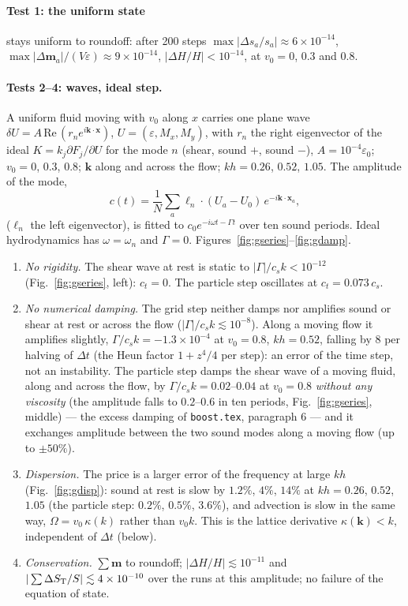 \documentclass[11pt,aps,preprint,nofootinbib,superscriptaddress,tightenlines]{revtex4-2}
\def\st{\begin{equation}}
\def\stp{\end{equation}}
\def\Fig#1{Fig.~\ref{#1}}
\let\oldparagraph\paragraph
\renewcommand{\paragraph}{\par\bigskip\oldparagraph}
\begin{document}
\paragraph{Test 1: the uniform state} stays uniform to roundoff: after 200 steps
$\max|\Delta s_a/s_a|\approx6\times10^{-14}$, $\max|\Delta\bm m_a|/(V\varepsilon)\approx9\times10^{-14}$,
$|\Delta H/H|<10^{-14}$, at $v_0=0$, $0.3$ and $0.8$.

\paragraph{Tests 2--4: waves, ideal step.}  A uniform fluid moving with $v_0$ along $x$ carries one
plane wave $\delta U=A\,\mathrm{Re}\,(r_n e^{i\bm k\cdot\bm x})$, $U=(\varepsilon,M_x,M_y)$, with $r_n$ the right
eigenvector of the ideal $K=k_j\partial F_j/\partial U$ for the mode $n$ (shear, sound $+$, sound $-$),
$A=10^{-4}\varepsilon_0$; $v_0=0$, $0.3$, $0.8$; $\bm k$ along and across the flow; $kh=0.26$, $0.52$, $1.05$.
The amplitude of the mode,
\st
c(t)=\frac1N\sum_a\ell_n\cdot(U_a-U_0)\,e^{-i\bm k\cdot\bm x_a},
\stp
($\ell_n$ the left eigenvector), is fitted to $c_0e^{-i\omega t-\Gamma t}$ over ten sound periods.  Ideal
hydrodynamics has $\omega=\omega_n$ and $\Gamma=0$.  Figures~\ref{fig:gseries}--\ref{fig:gdamp}.
\begin{enumerate}
\item \emph{No rigidity.}  The shear wave at rest is static to $|\Gamma|/c_sk<10^{-12}$
  (\Fig{fig:gseries}, left): $c_t=0$.  The particle step oscillates at $c_t=0.073\,c_s$.
\item \emph{No numerical damping.}  The grid step neither damps nor amplifies sound or shear at rest
  or across the flow ($|\Gamma|/c_sk\lesssim10^{-8}$).  Along a moving flow it amplifies slightly,
  $\Gamma/c_sk=-1.3\times10^{-4}$ at $v_0=0.8$, $kh=0.52$, falling by 8 per halving of $\Delta t$ (the Heun
  factor $1+z^4/4$ per step): an error of the time step, not an instability.  The particle step
  damps the shear wave of a moving fluid, along and across the flow, by $\Gamma/c_sk=0.02$--$0.04$
  at $v_0=0.8$ \emph{without any viscosity} (the amplitude falls to $0.2$--$0.6$ in ten periods,
  \Fig{fig:gseries}, middle) --- the excess damping of \texttt{boost.tex}, paragraph 6 --- and it
  exchanges amplitude between the two sound modes along a moving flow (up to $\pm50\%$).
\item \emph{Dispersion.}  The price is a larger error of the frequency at large $kh$
  (\Fig{fig:gdisp}): sound at rest is slow by $1.2\%$, $4\%$, $14\%$ at $kh=0.26$, $0.52$, $1.05$ (the
  particle step: $0.2\%$, $0.5\%$, $3.6\%$), and advection is slow in the same way, $\Omega=v_0\,\kappa(k)$
  rather than $v_0k$.  This is the lattice derivative $\kappa(\bm k)<k$, independent of $\Delta t$ (below).
\item \emph{Conservation.}  $\sum\bm m$ to roundoff; $|\Delta H/H|\lesssim10^{-11}$ and
  $|\sum\Delta S_{\rm T}/S|\lesssim4\times10^{-10}$ over the runs at this amplitude; no failure of the equation of state.
\end{enumerate}
\end{document}
